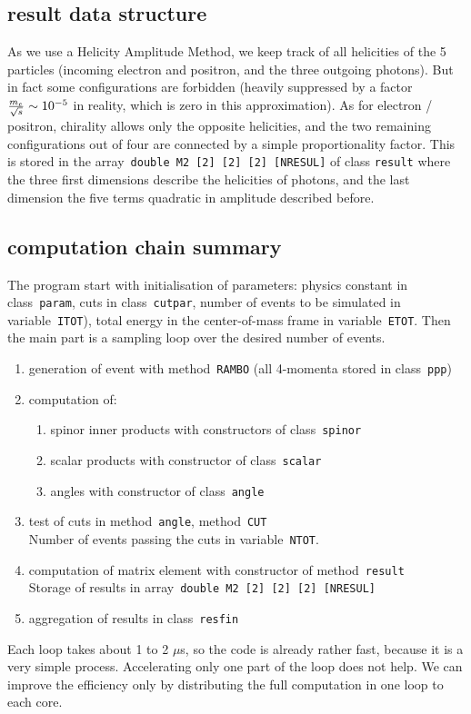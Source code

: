 \documentclass[a4paper]{article}
\begin{document}
\subsection{result data structure}
As we use a Helicity Amplitude Method, we keep track of all helicities of the 5 particles (incoming electron and positron, and the three outgoing photons). But in fact some configurations are forbidden (heavily suppressed by a factor ${m_e\over\sqrt{s}}\sim 10^{-5}$ in reality, which is zero in this approximation). As for electron / positron, chirality allows only the opposite helicities, and the two remaining configurations out of four are connected by a simple proportionality factor.
This is stored in the array~\texttt{double M2 [2] [2] [2] [NRESUL]} of class \texttt{result} where the three first dimensions describe the helicities of photons, and the last dimension the five terms quadratic in amplitude described before.

\subsection{computation chain summary}
The program start with initialisation of parameters: physics constant in class~\texttt{param}, cuts in class~\texttt{cutpar}, number of events to be simulated in variable~\texttt{ITOT}), total energy in the center-of-mass frame in variable~\texttt{ETOT}. Then the main part is a sampling loop over the desired number of events.

\begin{enumerate}
\item generation of event with method~\texttt{RAMBO} (all 4-momenta stored in class~\texttt{ppp})
\item computation of:
\begin{enumerate}
\item spinor inner products with constructors of class~\texttt{spinor}
\item scalar products with constructor of class~\texttt{scalar}
\item angles with constructor of class~\texttt{angle}
\end{enumerate}
\item test of cuts in method~\texttt{angle}, method~\texttt{CUT}\\
  Number of events passing the cuts in variable~\texttt{NTOT}.
\item computation of matrix element with constructor of method~\texttt{result}\\
  Storage of results in array~\texttt{double M2 [2] [2] [2] [NRESUL]}
\item aggregation of results in class~\texttt{resfin}
\end{enumerate}

Each loop takes about 1 to 2 $\mu$s, so the code is already rather fast, because it is a very simple process. Accelerating only one part of the loop does not help. We can improve the efficiency only by distributing the full computation in one loop to each core.

\end{document}
